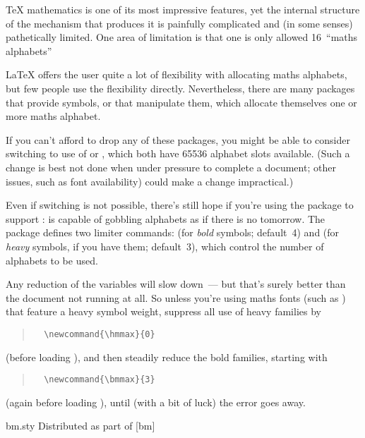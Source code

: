 {\TeX{} mathematics is one of its most impressive features, yet the
internal structure of the mechanism that produces it is painfully
complicated and (in some senses) pathetically limited.  One area of
limitation is that one is only allowed 16~``maths alphabets''

\LaTeX{} offers the user quite a lot of flexibility with allocating
maths alphabets, but few people use the flexibility directly.
Nevertheless, there are many packages that provide symbols, or that
manipulate them, which allocate themselves one or more maths alphabet.

If you can't afford to drop any of these packages, you might be able
to consider switching to use of  or
, which both have 65536 alphabet slots
available.  (Such a change is best not done when under pressure to
complete a document; other issues, such as font availability) could
make a change impractical.)

Even if switching is not possible, there's still hope if you're using
the  package to support :
 is capable of gobbling alphabets as if there is no
tomorrow.  The package defines two limiter commands:  (for
\emph{bold} symbols; default~4) and  (for \emph{heavy}
symbols, if you have them; default~3), which control the number of
alphabets to be used.

Any reduction of the  variables will slow
 down~--- but that's surely better than the document not
running at all.  So unless you're using maths fonts (such as
) that feature a heavy symbol weight, suppress all
use of heavy families by
\begin{quote}
\begin{verbatim}
  \newcommand{\hmmax}{0}
\end{verbatim}
\end{quote}
(before loading ), and then steadily reduce the bold
families, starting with 
\begin{quote}
\begin{verbatim}
  \newcommand{\bmmax}{3}
\end{verbatim}
\end{quote}
(again before loading ), until (with a bit of luck) the
error goes away.
\begin{ctanrefs}
\item[bm.sty]Distributed as part of [bm]
\end{ctanrefs}

}
